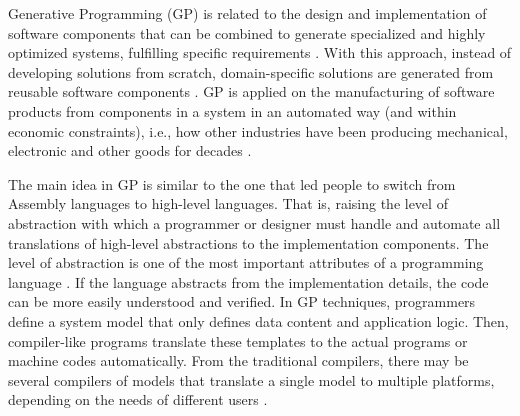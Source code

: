Generative Programming (GP) is related to the design and implementation of software components that can be combined to generate specialized and highly optimized systems, fulfilling specific requirements \cite{czarnecki1998}. With this approach, instead of developing solutions from scratch, domain-specific solutions are generated from reusable software components \cite{arora2009}. GP is applied on the manufacturing of software products from components in a system in an automated way (and within economic constraints), i.e., how other industries have been producing mechanical, electronic and other goods for decades \cite{barth2002}.


The main idea in GP is similar to the one that led people to switch from Assembly languages to high-level languages. That is, raising the level of abstraction with which a programmer or designer must handle and automate all translations of high-level abstractions to the implementation components. The level of abstraction is one of the most important attributes of a programming language \cite{paska2009}. If the language abstracts from the implementation details, the code can be more easily understood and verified. In GP techniques, programmers define a system model that only defines data content and application logic. Then, compiler-like programs translate these templates to the actual programs or machine codes automatically. From the traditional compilers, there may be several compilers of models that translate a single model to multiple platforms, depending on the needs of different users \cite{azimi2003}.

